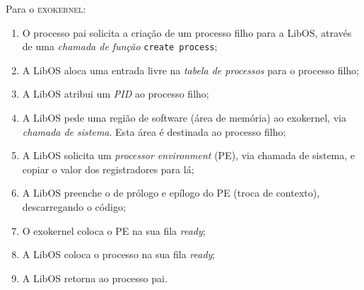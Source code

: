 Para o \textsc{exokernel}:
\begin{enumerate}
  \item O processo pai solicita a criação de um processo filho para a LibOS, através de uma \textit{chamada de função} \texttt{create process};

  \item A LibOS aloca uma entrada livre na \textit{tabela de processos} para o processo filho;

  \item A LibOS atribui um \textit{PID} ao processo filho;

  \item A LibOS pede uma região de software (área de memória) ao exokernel, via \textit{chamada de sistema}. Esta área é destinada ao processo filho;

  \item A LibOS solicita um \textit{processor environment} (PE), via chamada de sistema, e copiar o valor dos registradores para lá;

  \item A LibOS preenche o de prólogo e epílogo do PE (troca de contexto), descarregando o código;

  \item O exokernel coloca o PE na sua fila \textit{ready};

  \item A LibOS coloca o processo na sua fila \textit{ready};

  \item A LibOS retorna ao processo pai.
\end{enumerate}
